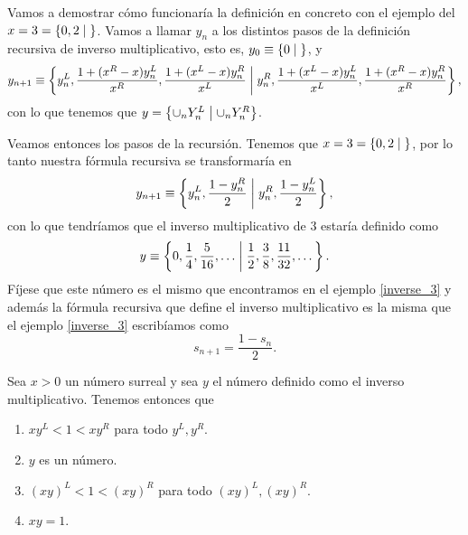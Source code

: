     \begin{example}
        Vamos a demostrar c\'omo funcionar\'ia la definici\'on en concreto con el ejemplo del $x = 3 = \left\{0,2\;\middle|\; \right\}$. Vamos a llamar $y_n$ a los distintos pasos de la definici\'on recursiva de inverso multiplicativo, esto es, $y_0 \equiv \left\{0\;\middle|\; \right\}$, y 
        \[
            y_{n+1} \equiv \left\{y_n^L, \frac{1+(x^R-x)y_n^L}{x^R}, \frac{1+(x^L-x)y_n^R}{x^L}\;\middle|\; y_n^R, \frac{1+(x^L-x)y_n^L}{x^L}, \frac{1+(x^R-x)y_n^R}{x^R}\right\},
        \]
        con lo que tenemos que $y = \left\{\cup_n Y_n^L\;\middle|\; \cup_n Y_n^R\right\}$. 
        
        Veamos entonces los pasos de la recursi\'on. Tenemos que $x = 3 = \left\{0,2\;\middle|\; \right\}$, por lo tanto nuestra f\'ormula recursiva se transformar\'ia en 
        \[
            y_{n+1} \equiv \left\{y_n^L, \frac{1-y_n^R}{2}\;\middle|\; y_n^R, \frac{1-y_n^L}{2}\right\},
        \]
        con lo que tendr\'iamos que el inverso multiplicativo de $3$ estar\'ia definido como
        \[
            y \equiv \left\{0,\frac{1}{4}, \frac{5}{16}, \dots\;\middle|\; \frac{1}{2}, \frac{3}{8}, \frac{11}{32},\dots\right\}.
        \]
        F\'ijese que este n\'umero es el mismo que encontramos en el ejemplo \ref{inverse_3} y adem\'as la f\'ormula recursiva que define el inverso multiplicativo es la misma que el ejemplo \ref{inverse_3} escrib\'iamos como
        \[
            s_{n+1} = \frac{1-s_{n}}{2}.
        \]
    \end{example}

    \begin{theorem}
        Sea $x > 0$ un n\'umero surreal y sea $y$ el n\'umero definido como el inverso multiplicativo. Tenemos entonces que
        \begin{enumerate}[nosep]
            \item $xy^L < 1 < xy^R$ para todo $y^L, y^R$.
            \item $y$ es un n\'umero.
            \item $(xy)^L < 1 < (xy)^R$ para todo $(xy)^L, (xy)^R$.
            \item $xy=1$.
        \end{enumerate}
    \end{theorem}

